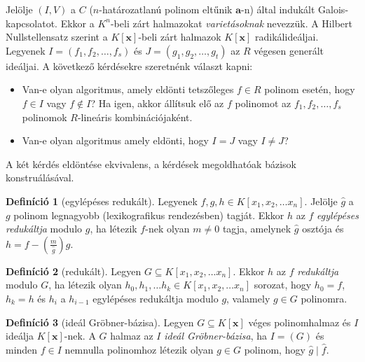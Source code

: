 \documentclass[DIV=15,appendixprefix]{scrreprt}
\theoremstyle{definition}
\newtheorem*{defin}{Definíció}
\theoremstyle{remark}
\begin{document}
Jelölje $ \left( I,{} V \right) $ a $ C $ ($ n $-határozatlanú polinom eltűnik
$ \mathbf{ a } $-n) által indukált Galois-kapcsolatot. Ekkor a $ K^{ n } $-beli zárt halmazokat
\emph{varietásoknak} nevezzük. A Hilbert Nullstellensatz szerint a $ K \left[ \mathbf{ x }
\right] $-beli zárt halmazok $ K \left[ \mathbf{ x } \right] $ radikálideáljai.
%
Legyenek $ I = \left( f_{ 1 },{} f_{ 2 },{} \ldots,{} f_{ s } \right) $ és $ J = \left( g_{ 1 },{}
g_{ 2 },{} \ldots,{} g_{ t } \right) $ az $ R $ végesen generált ideáljai. A következő kérdésekre
szeretnénk választ kapni:
\begin{itemize}
	\item Van-e olyan algoritmus, amely eldönti tetszőleges $ f \in R $ polinom esetén, hogy $ f \in
		I $ vagy $ f \not\in I $? Ha igen, akkor állítsuk elő az $ f $ polinomot az $ f_{ 1 },{}
		f_{ 2 },{} \ldots,{} f_{ s }$ polinomok $ R $-lineáris kombinációjaként.
	\item Van-e olyan algoritmus amely eldönti, hogy $ I = J $ vagy $ I \neq J $?
\end{itemize}
A két kérdés eldöntése ekvivalens, a kérdések megoldhatóak  bázisok konstruálásával.
\begin{defin}[egylépéses redukált]
	Legyenek $ f,{} g,{} h \in K \left[ x_{ 1 },{} x_{ 2 },{} \ldots x_{ n } \right] $. Jelölje
	$ \hat{ g } $ a $g$ polinom legnagyobb (lexikografikus rendezésben) tagját. Ekkor $ h $ az $ f $
	\emph{egylépéses redukáltja} modulo $ g $, ha létezik $ f $-nek olyan $ m \neq 0 $ tagja,
	amelynek $ \hat{ g } $ osztója és $ h = f - \left( \frac{ m }{ \hat{ g } } \right)  g $.
\end{defin}
\begin{defin}[redukált]
	Legyen $ G \subseteq K \left[ x_{ 1 },{} x_{ 2 },{} \ldots x_{ n } \right] $. Ekkor $ h $ az
	$ f $ \emph{redukáltja} modulo $ G $, ha létezik olyan $ h_{ 0 },{} h_{ 1 },{} \ldots h_{ k }
	\in K \left[ x_{ 1 },{} x_{ 2 },{} \ldots x_{ n } \right] $ sorozat, hogy $ h_{ 0 } = f $,
	$ h_{ k } = h $ és $ h_{ i } $ a $h_{ i - 1 }$ egylépéses redukáltja modulo $ g $, valamely
	$ g \in G $ polinomra.
\end{defin}
%
\begin{defin}[ideál Gröbner-bázisa]
	Legyen $ G \subseteq K \left[ \mathbf{ x } \right] $ véges polinomhalmaz és $ I $ ideálja
	$ K \left[ \mathbf{ x } \right] $-nek. A $ G $ halmaz az $ I $ \emph{ideál Gröbner-bázisa}, ha
	$ I = \left( G \right) $ és minden $ f \in I $ nemnulla polinomhoz létezik olyan $ g \in G $
	polinom, hogy $ \hat{ g } \mid \hat{ f } $.
\end{defin}
\end{document}
